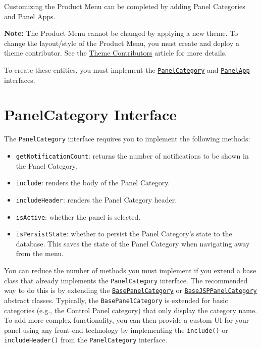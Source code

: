 Customizing the Product Menu can be completed by adding Panel Categories
and Panel Apps.

\noindent\hrulefill

\textbf{Note:} The Product Menu cannot be changed by applying a new
theme. To change the layout/style of the Product Menu, you must create
and deploy a theme contributor. See the
\href{/docs/7-2/frameworks/-/knowledge_base/f/packaging-independent-ui-resources-for-your-site}{Theme
Contributors} article for more details.

\noindent\hrulefill

To create these entities, you must implement the
\href{https://docs.liferay.com/dxp/apps/application-list/latest/javadocs/com/liferay/application/list/PanelCategory.html}{\texttt{PanelCategory}}
and
\href{https://docs.liferay.com/dxp/apps/application-list/latest/javadocs/com/liferay/application/list/PanelApp.html}{\texttt{PanelApp}}
interfaces.

\section{PanelCategory Interface}\label{panelcategory-interface}

The \texttt{PanelCategory} interface requires you to implement the
following methods:

\begin{itemize}
\tightlist
\item
  \texttt{getNotificationCount}: returns the number of notifications to
  be shown in the Panel Category.
\item
  \texttt{include}: renders the body of the Panel Category.
\item
  \texttt{includeHeader}: renders the Panel Category header.
\item
  \texttt{isActive}: whether the panel is selected.
\item
  \texttt{isPersistState}: whether to persist the Panel Category's state
  to the database. This saves the state of the Panel Category when
  navigating away from the menu.
\end{itemize}

You can reduce the number of methods you must implement if you extend a
base class that already implements the \texttt{PanelCategory} interface.
The recommended way to do this is by extending the
\href{https://docs.liferay.com/dxp/apps/application-list/latest/javadocs/com/liferay/application/list/BasePanelCategory.html}{\texttt{BasePanelCategory}}
or
\href{https://docs.liferay.com/dxp/apps/application-list/latest/javadocs/com/liferay/application/list/BaseJSPPanelCategory.html}{\texttt{BaseJSPPanelCategory}}
abstract classes. Typically, the \texttt{BasePanelCategory} is extended
for basic categories (e.g., the Control Panel category) that only
display the category name. To add more complex functionality, you can
then provide a custom UI for your panel using any front-end technology
by implementing the \texttt{include()} or \texttt{includeHeader()} from
the \texttt{PanelCategory} interface.

